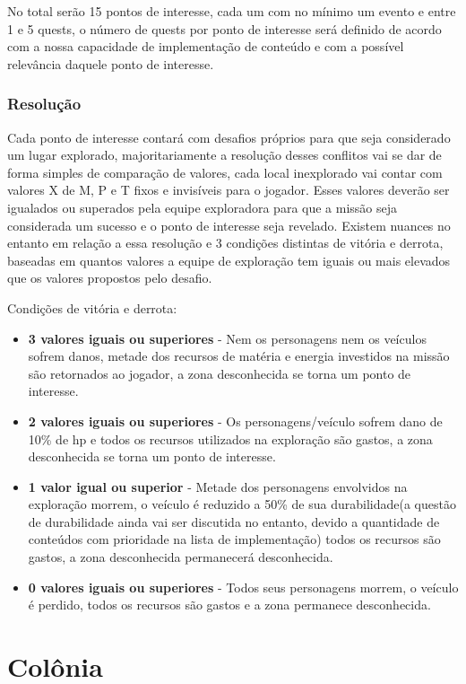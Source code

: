 \documentclass[11pt]{article} %
\begin{document}
No total serão 15 pontos de interesse, cada um com no mínimo um evento e entre 1 e 5 quests, o número de quests por ponto de interesse será definido de acordo com a nossa capacidade de implementação de conteúdo e com a possível relevância daquele ponto de interesse.

\subsubsection{Resolução}
Cada ponto de interesse contará com desafios próprios para que seja considerado um lugar explorado, majoritariamente a resolução desses conflitos vai se dar de forma simples de comparação de valores, cada local inexplorado vai contar com valores X de M, P e T fixos e invisíveis para o jogador. Esses valores deverão ser igualados ou superados pela equipe exploradora para que a missão seja considerada um sucesso e o ponto de interesse seja revelado. Existem nuances no entanto em relação a essa resolução e 3 condições distintas de vitória e derrota, baseadas em quantos valores a equipe de exploração tem iguais ou mais elevados que os valores propostos pelo desafio.

Condições de vitória e derrota:
\begin{itemize}
  \item \textbf{3 valores iguais ou superiores} - Nem os personagens nem os veículos sofrem danos, metade dos recursos de matéria e energia investidos na missão são retornados ao jogador, a zona desconhecida se torna um ponto de interesse.
  \item \textbf{2 valores iguais ou superiores} - Os personagens/veículo sofrem dano de 10\% de hp e todos os recursos utilizados na exploração são gastos, a zona desconhecida se torna um ponto de interesse.
  \item \textbf{1 valor igual ou superior} - Metade dos personagens envolvidos na exploração morrem, o veículo é reduzido a 50\% de sua durabilidade(a questão de durabilidade ainda vai ser discutida no entanto, devido a quantidade de conteúdos com prioridade na lista de implementação) todos os recursos são gastos, a zona desconhecida permanecerá desconhecida.
  \item \textbf{0 valores iguais ou superiores} - Todos seus personagens morrem, o veículo é perdido, todos os recursos são gastos e a zona permanece desconhecida.
\end{itemize}

\newpage

\section{Colônia}
\end{document}
